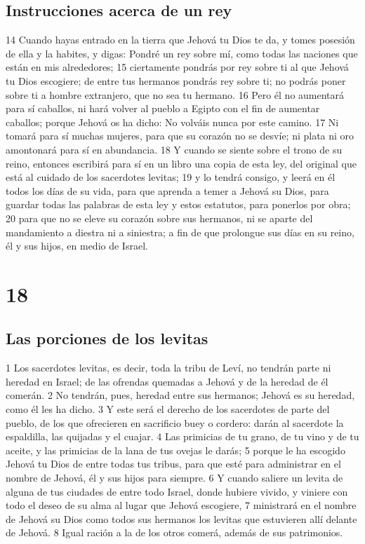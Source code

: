 \section{Instrucciones acerca de un rey}

14 Cuando hayas entrado en la tierra que Jehová tu Dios te da, y tomes posesión de ella y la habites, y digas: Pondré un rey sobre mí, como todas las naciones que están en mis alrededores;
15 ciertamente pondrás por rey sobre ti al que Jehová tu Dios escogiere; de entre tus hermanos pondrás rey sobre ti; no podrás poner sobre ti a hombre extranjero, que no sea tu hermano.
16 Pero él no aumentará para sí caballos, ni hará volver al pueblo a Egipto con el fin de aumentar caballos; porque Jehová os ha dicho: No volváis nunca por este camino.
17 Ni tomará para sí muchas mujeres, para que su corazón no se desvíe; ni plata ni oro amontonará para sí en abundancia. 
18 Y cuando se siente sobre el trono de su reino, entonces escribirá para sí en un libro una copia de esta ley, del original que está al cuidado de los sacerdotes levitas;
19 y lo tendrá consigo, y leerá en él todos los días de su vida, para que aprenda a temer a Jehová su Dios, para guardar todas las palabras de esta ley y estos estatutos, para ponerlos por obra;
20 para que no se eleve su corazón sobre sus hermanos, ni se aparte del mandamiento a diestra ni a siniestra; a fin de que prolongue sus días en su reino, él y sus hijos, en medio de Israel. 


\chapter{18}

\section{Las porciones de los levitas}

1 Los sacerdotes levitas, es decir, toda la tribu de Leví, no tendrán parte ni heredad en Israel; de las ofrendas quemadas a Jehová y de la heredad de él comerán.
2 No tendrán, pues, heredad entre sus hermanos; Jehová es su heredad, como él les ha dicho. 
3 Y este será el derecho de los sacerdotes de parte del pueblo, de los que ofrecieren en sacrificio buey o cordero: darán al sacerdote la espaldilla, las quijadas y el cuajar.
4 Las primicias de tu grano, de tu vino y de tu aceite, y las primicias de la lana de tus ovejas le darás;
5 porque le ha escogido Jehová tu Dios de entre todas tus tribus, para que esté para administrar en el nombre de Jehová, él y sus hijos para siempre.
6 Y cuando saliere un levita de alguna de tus ciudades de entre todo Israel, donde hubiere vivido, y viniere con todo el deseo de su alma al lugar que Jehová escogiere,
7 ministrará en el nombre de Jehová su Dios como todos sus hermanos los levitas que estuvieren allí delante de Jehová.
8 Igual ración a la de los otros comerá, además de sus patrimonios.

